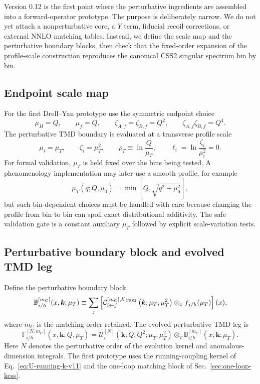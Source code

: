 \documentclass[11pt]{article}
\newcommand{\bk}{\bm{k}}
\newcommand{\ot}{\otimes_T}
\newcommand{\ox}{\otimes_x}
\newcommand{\KCSS}{\mathcal K_{\rm CSS2}}
\begin{document}
Version 0.12 is the first point where the perturbative ingredients are assembled into a
forward-operator prototype.  The purpose is deliberately narrow.  We do not yet attach a
nonperturbative core, a $Y$ term, fiducial recoil corrections, or external NNLO matching
tables.  Instead, we define the scale map and the perturbative boundary blocks, then check
that the fixed-order expansion of the profile-scale construction reproduces the canonical
CSS2 singular spectrum bin by bin.

\subsection{Endpoint scale map}

For the first Drell--Yan prototype use the symmetric endpoint choice
\begin{equation}
  \mu_H=Q,
  \qquad
  \mu_f=Q,
  \qquad
  \zeta_{A,f}=\zeta_{B,f}=Q^2,
  \qquad
  \zeta_{A,f}\zeta_{B,f}=Q^4 .
  \label{eq:wproto-final-scales-v12}
\end{equation}
The perturbative TMD boundary is evaluated at a transverse profile scale
\begin{equation}
  \mu_i=\mu_T,
  \qquad
  \zeta_i=\mu_T^2,
  \qquad
  \rho_T\equiv\ln\frac{Q}{\mu_T},
  \qquad
  \ell_i=\ln\frac{\zeta_i}{\mu_i^2}=0 .
  \label{eq:wproto-boundary-scales-v12}
\end{equation}
For formal validation, $\mu_T$ is held fixed over the bins being tested.  A phenomenology
implementation may later use a smooth profile, for example
\begin{equation}
  \mu_T(q;Q,\mu_0)=\min\!\left[Q,\sqrt{q^2+\mu_0^2}\right],
  \label{eq:wproto-simple-profile-v12}
\end{equation}
but such bin-dependent choices must be handled with care because changing the profile
from bin to bin can spoil exact distributional additivity.  The safe validation gate is a
constant auxiliary $\mu_T$ followed by explicit scale-variation tests.

\subsection{Perturbative boundary block and evolved TMD leg}

Define the perturbative boundary block
\begin{equation}
  \mathbb B_{i/h}^{[m_C]}(x,\bk;\mu_T)
  \equiv
  \sum_j
  \left[
    \mathcal C_{i\leftarrow j}^{[m_C],\KCSS}\left(\bk;\mu_T,\mu_T^2\right)
    \ox f_{j/h}(\mu_T)
  \right](x),
  \label{eq:wproto-boundary-block-v12}
\end{equation}
where $m_C$ is the matching order retained.  The evolved perturbative TMD leg is
\begin{equation}
  \mathbb F_{i/h}^{[N,m_C]}(x,\bk;Q,\mu_T)
  =
  \mathcal U_i^{[N]}(\bk;Q,Q^2;\mu_T,\mu_T^2)
  \ot
  \mathbb B_{i/h}^{[m_C]}(x,\bk;\mu_T).
  \label{eq:wproto-evolved-leg-v12}
\end{equation}
Here $N$ denotes the perturbative order of the evolution kernel and anomalous-dimension
integrals.  The first prototype uses the running-coupling kernel of
Eq.~\eqref{eq:U-running-k-v11} and the one-loop matching block of
Sec.~\ref{sec:one-loop-kcss}.
\end{document}
